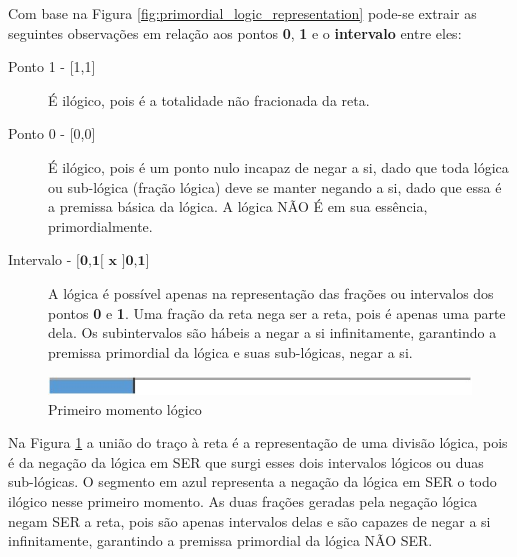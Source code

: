 Com base na Figura \ref{fig:primordial_logic_representation} pode-se extrair as seguintes observações em relação aos pontos \textbf{0}, \textbf{1} e o \textbf{intervalo} entre eles:
\begin{description}
   \item[Ponto 1 - {[1,1]}] É ilógico, pois é a totalidade não fracionada da reta.
   \item[Ponto 0 - {[0,0]}] É ilógico, pois é um ponto nulo incapaz de negar a si, dado que toda lógica ou sub-lógica (fração lógica) deve se manter negando a si, dado que essa é a premissa básica da lógica. A lógica NÃO É em sua essência, primordialmente.
   \item[Intervalo - $\textbf{{[0,1[ x ]0,1]}}$] A lógica é possível apenas na representação das frações ou intervalos dos pontos \textbf{0} e \textbf{1}. Uma fração da reta nega ser a reta, pois é apenas uma parte dela. Os subintervalos são hábeis a negar a si infinitamente, garantindo a premissa primordial da lógica e suas sub-lógicas, negar a si. 
\end{description}

\begin{figure}[H]
\caption{Primeiro momento lógico}
\label{fig:first_logical_moment}
\centering
\includegraphics[scale=1]{sections/images/first_logical_moment.jpg}
\end{figure}

Na Figura \ref{fig:first_logical_moment} a união do traço à reta é a representação de uma divisão lógica, pois é da negação da lógica em SER que surgi esses dois intervalos lógicos ou duas sub-lógicas. O segmento em azul representa a negação da lógica em SER o todo ilógico nesse primeiro momento. As duas frações geradas pela negação lógica negam SER a reta, pois são apenas intervalos delas e são capazes de negar a si infinitamente, garantindo a premissa primordial da lógica NÃO SER. 







